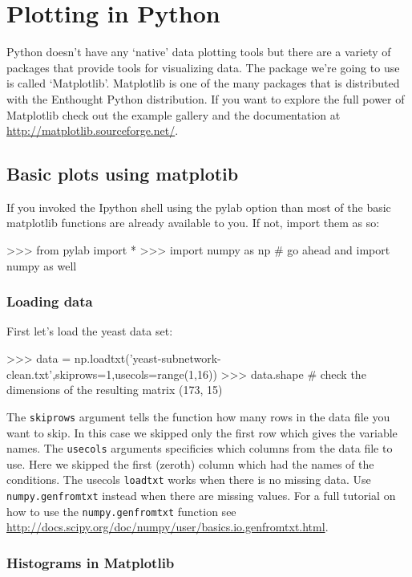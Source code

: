 
\section{Plotting in Python}

Python doesn't have any `native' data plotting tools but there are a
variety of packages that provide tools for visualizing data. The package
we're going to use is called `Matplotlib'. Matplotlib is one of the many
packages that is distributed with the Enthought Python distribution. If
you want to explore the full power of Matplotlib check out the example
gallery and the documentation at
\url{http://matplotlib.sourceforge.net/}.

\subsection{Basic plots using matplotib}

If you invoked the Ipython shell using the pylab option than most of the
basic matplotlib functions are already available to you. If not, import
them as so:

\begin{python}
>>> from pylab import *
>>> import numpy as np # go ahead and import numpy as well
\end{python}
\subsubsection{Loading data}

First let's load the yeast data set:

\begin{python}
>>> data = np.loadtxt('yeast-subnetwork-clean.txt',skiprows=1,usecols=range(1,16))
>>> data.shape   # check the dimensions of the resulting matrix
(173, 15)
\end{python}
The \lstinline!skiprows! argument tells the function how many rows in
the data file you want to skip. In this case we skipped only the first
row which gives the variable names. The \lstinline!usecols! arguments
specificies which columns from the data file to use. Here we skipped the
first (zeroth) column which had the names of the conditions. The usecols
\lstinline!loadtxt! works when there is no missing data. Use
\lstinline!numpy.genfromtxt! instead when there are missing values. For
a full tutorial on how to use the \lstinline!numpy.genfromtxt! function
see
\url{http://docs.scipy.org/doc/numpy/user/basics.io.genfromtxt.html}.

\subsubsection{Histograms in Matplotlib}

